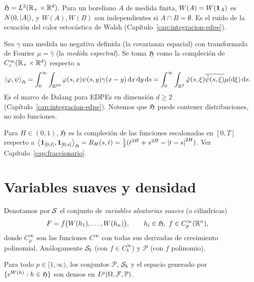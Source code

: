 \begin{ejemplo}
$\mathfrak{H}=L^2(\mathbb{R}_+\times\mathbb{R}^d)$. Para un boreliano $A$ de
medida finita, $W(A)=W(\mathbf{1}_A)$ es $N(0,\left\lvert A\right\rvert)$, y $W(A),W(B)$ son independientes si $A\cap B=\emptyset$.
Es el ruido de la ecuación del calor estocástica de Walsh (Capítulo~\ref{cap:integracion-edpe}).
\end{ejemplo}

\begin{ejemplo}
Sea $\gamma$ una medida no negativa definida (la covarianza
espacial) con transformada de Fourier $\mu=\hat\gamma$ (la \emph{medida espectral}). Se toma $\mathfrak{H}$ como la compleción
de $C_c^\infty(\mathbb{R}_+\times\mathbb{R}^d)$ respecto a
\[
  \left\langle \varphi, \psi\right\rangle_{\mathfrak{H}}=\int_0^\infty\int_{\mathbb{R}^{2d}}\varphi(s,x)\psi(s,y)\gamma(x-y)\,\mathrm{d} x\,\mathrm{d} y\,\mathrm{d} s=\int_0^\infty\int_{\mathbb{R}^d}\hat\varphi(s,\xi)\overline{\hat\psi(s,\xi)}\mu(\mathrm{d}\xi)\,\mathrm{d} s.
\]
Es el marco de Dalang para EDPEs en dimensión $d\ge2$ (Capítulo~\ref{cap:integracion-edpe}). Notemos que $\mathfrak{H}$ puede
contener distribuciones, no solo funciones.
\end{ejemplo}

\begin{ejemplo}
Para $H\in(0,1)$, $\mathfrak{H}$ es la compleción de las funciones
escalonadas en $[0,T]$ respecto a $\left\langle \mathbf{1}_{[0,t]}, \mathbf{1}_{[0,s]}\right\rangle_{\mathfrak{H}}=R_H(s,t)=\frac12(t^{2H}+s^{2H}-\left\lvert t-s\right\rvert^{2H})$. Ver
Capítulo~\ref{cap:fraccionario}.
\end{ejemplo}

\section{Variables suaves y densidad}

\begin{definicion}
Denotamos por $\mathcal{S}$ el conjunto de \emph{variables aleatorias suaves} (o cilíndricas)
\[
  F=f\big(W(h_1),\dots,W(h_n)\big),\qquad h_i\in\mathfrak{H},\ f\in C_p^\infty(\mathbb{R}^n),
\]
donde $C_p^\infty$ son las funciones $C^\infty$ con todas sus derivadas de crecimiento polinomial. Análogamente
$\mathcal{S}_b$ (con $f\in C_b^\infty$) y $\mathcal P$ (con $f$ polinomio).
\end{definicion}

\begin{lema}\label{lem:densidad-suaves}
Para todo $p\in[1,\infty)$, los conjuntos $\mathcal P$, $\mathcal{S}_b$ y el espacio generado por $\{e^{W(h)}:h\in\mathfrak{H}\}$
son densos en $L^p(\Omega,\mathcal{F},\mathbb{P})$.
\end{lema}

